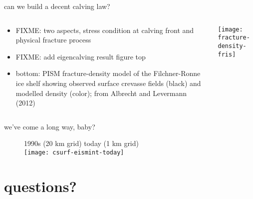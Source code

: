 \documentclass[hide notes,intlimits]{beamer}
\begin{document}
\begin{frame}{can we build a decent calving law?}

\begin{columns}
\begin{column}{0.45\textwidth}
\begin{itemize}
\item FIXME: two aspects, stress condition at calving front and physical fracture process
\item FIXME: add eigencalving result figure top
\item \alert{bottom:} PISM fracture-density model of the Filchner-Ronne ice shelf showing observed surface crevasse fields (black) and modelled density (color); from Albrecht and Levermann (2012)
\end{itemize}
\end{column}

\begin{column}{0.55\textwidth}
\vspace{-0.1in}
  \texttt{[image: fracture-density-fris]}
\end{column}
\end{columns}
\end{frame}


\begin{frame}{we've come a long way, baby?}
  \vspace{-.25cm}
  \begin{figure}
    1990s (20 km grid) \hspace{1.75cm} today (1 km grid)\\
    \texttt{[image: csurf-eismint-today]}
  \end{figure}
\end{frame}


\section{questions?}
\end{document}
